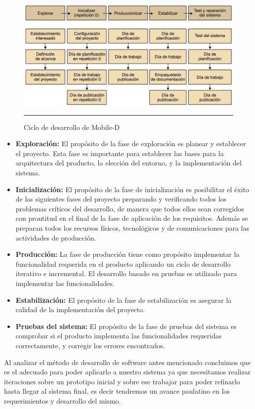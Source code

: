 \begin{figure}[htbp]
	\centering
		\includegraphics[width=1\textwidth]{Figuras/cicloDesarrollo.png}
		\rule{30em}{0.5pt}
	\caption[Ciclo de desarrollo de Mobile-D]{Ciclo de desarrollo de Mobile-D}
	\label{fig:cicloDesarrollo}
\end{figure}

\begin{itemize}
	\item \textbf{Exploración: }El propósito de la fase de exploración es planear y establecer el proyecto. Esta fase es importante para establecer las bases para la arquitectura del producto, la elección del entorno, y la implementación del sistema.
	\item \textbf{Inicialización: }El propósito de la fase de inicialización es posibilitar el éxito de las siguientes fases del proyecto preparando y verificando todos los problemas críticos del desarrollo, de manera que todos ellos sean corregidos con prontitud en el final de la fase de  aplicación de los requisitos. Además se preparan todos los recursos físicos, tecnológicos y de comunicaciones para las actividades de producción. 
	\item \textbf{Producción: }La fase de producción tiene como propósito implementar la funcionalidad requerida en el producto aplicando un ciclo de desarrollo iterativo e incremental. El desarrollo basado en pruebas es utilizado para implementar las funcionalidades.
	\item \textbf{Estabilización: }El propósito de la fase de estabilización es asegurar la calidad de la implementación del proyecto.
	\item \textbf{Pruebas del sistema: }El propósito de la fase de pruebas del sistema es comprobar si el producto implementa las funcionalidades requeridas correctamente, y corregir los errores encontrados.
\end{itemize}

Al analizar el método de desarrollo de software antes mencionado concluimos que es el adecuado para poder aplicarlo a nuestro sistema ya que necesitamos realizar iteraciones sobre un prototipo inicial y sobre ese trabajar para poder refinarlo hasta llegar al sistema final, es decir tendremos un avance paulatino en los requerimientos y desarrollo del mismo. \cite{MobileD} \cite{desDispositivos}